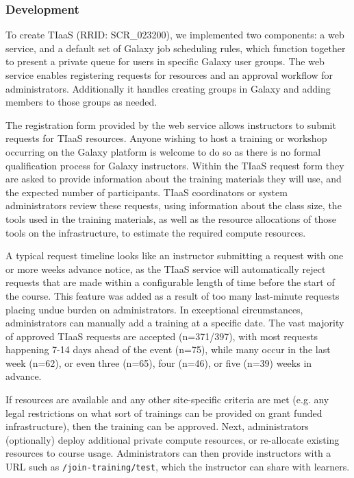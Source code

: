 \subsubsection*{Development}

To create TIaaS (RRID: SCR\_023200), we implemented two components: a web service, and a default set of Galaxy job scheduling rules, which function together to present a private queue for users in specific Galaxy user groups. The web service enables registering requests for resources and an approval workflow for administrators. Additionally it handles creating groups in Galaxy and adding members to those groups as needed.

The registration form provided by the web service allows instructors to submit requests for TIaaS resources. Anyone wishing to host a training or workshop occurring on the Galaxy platform is welcome to do so as there is no formal qualification process for Galaxy instructors. Within the TIaaS request form they are asked to provide information about the training materials they will use, and the expected number of participants. TIaaS coordinators or system administrators review these requests, using information about the class size, the tools used in the training materials, as well as the resource allocations of those tools on the infrastructure, to estimate the required compute resources.

A typical request timeline looks like an instructor submitting a request with one or more weeks advance notice, as the TIaaS service will automatically reject requests that are made within a configurable length of time before the start of the course. This feature was added as a result of too many last-minute requests placing undue burden on administrators. In exceptional circumstances, administrators can manually add a training at a specific date. The vast majority of approved TIaaS requests are accepted (n=371/397), with most requests happening 7-14 days ahead of the event (n=75), while many occur in the last week (n=62), or even three (n=65), four (n=46), or five (n=39) weeks in advance.

If resources are available and any other site-specific criteria are met (e.g. any legal restrictions on what sort of trainings can be provided on grant funded infrastructure), then the training can be approved. Next, administrators (optionally) deploy additional private compute resources, or re-allocate existing resources to course usage. Administrators can then provide instructors with a URL such as \texttt{/join-training/test}\cite{usegalaxyeu:join-training-test}, which the instructor can share with learners.

